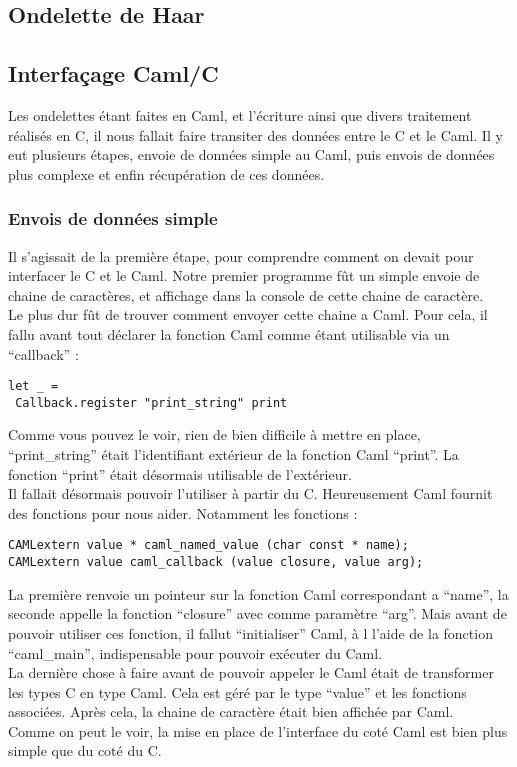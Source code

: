 \documentclass[a4paper,12pt]{article}
\begin{document}
	\subsection{Ondelette de Haar}

	\subsection{Interfaçage Caml/C}
Les ondelettes étant faites en Caml, et l'écriture ainsi que divers traitement
réalisés en C, il nous fallait faire transiter des données entre le C et le
Caml. Il y eut plusieurs étapes, envoie de données simple au Caml, puis envois
de données plus complexe et enfin récupération de ces données.\\

		\subsubsection{Envois de données simple}
Il s'agissait de la première étape, pour comprendre comment on devait pour
interfacer le C et le Caml. Notre premier programme fût un simple envoie de
chaine de caractères, et affichage dans la console de cette chaine de
caractère.\\
Le plus dur fût de trouver comment envoyer cette chaine a Caml. Pour cela, il
fallu avant tout déclarer la fonction Caml comme étant utilisable via un
``callback'' :
\begin{verbatim}
let _ =
 Callback.register "print_string" print
\end{verbatim}
Comme vous pouvez le voir, rien de bien difficile à mettre en place,
``print\_string'' était l'identifiant extérieur de la fonction Caml ``print''.
La fonction ``print'' était désormais utilisable de l'extérieur.\\
Il fallait désormais pouvoir l'utiliser à partir du C. Heureusement Caml fournit
des fonctions pour nous aider. Notamment les fonctions :
\begin{verbatim}
CAMLextern value * caml_named_value (char const * name);
CAMLextern value caml_callback (value closure, value arg);
\end{verbatim}
La première renvoie un pointeur sur la fonction Caml correspondant a ``name'',
la seconde appelle la fonction ``closure'' avec comme paramètre ``arg''. Mais
avant de pouvoir utiliser ces fonction, il fallut ``initialiser'' Caml, à l
l'aide de la fonction ``caml\_main'', indispensable pour pouvoir exécuter du
Caml.\\
La dernière chose à faire avant de pouvoir appeler le Caml était de transformer
les types C en type Caml. Cela est géré par le type ``value'' et les fonctions
associées. Après cela, la chaine de caractère était bien affichée par Caml.\\
Comme on peut le voir, la mise en place de l'interface du coté Caml est bien
plus simple que du coté du C.\\
\end{document}
